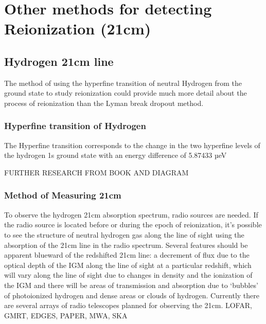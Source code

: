 
\section{Other methods for detecting Reionization (21cm)} %
\label{sec:other_methods21cm}

    \subsection{Hydrogen 21cm line} %
    \label{sub:Hydrogen_21cm}

The method of using the hyperfine transition of neutral Hydrogen from the ground state to study reionization could provide much more detail about the process of reionization than the Lyman break dropout method.

         \subsubsection{Hyperfine transition of Hydrogen} %
         \label{subsub:Hyperfine_Hydrogen}

The Hyperfine transition corresponds to the change in the two hyperfine levels of the hydrogen 1s ground state with an energy difference of 5.87433 µeV

FURTHER RESEARCH FROM BOOK AND DIAGRAM
    
	
         \subsubsection{Method of Measuring 21cm} %
	\label{subsub:Measuring_21cm} 

To observe the hydrogen 21cm absorption spectrum, radio sources are needed. If the radio source is located before or during the epoch of reionization, it’s possible to see the structure of neutral hydrogen gas along the line of sight using the absorption of the 21cm line in the radio spectrum. Several features should be apparent blueward of the redshifted 21cm line: a decrement of flux due to the optical depth of the IGM along the line of sight at a particular redshift, which will vary along the line of sight due to changes in density and the ionization of the IGM and there will be areas of transmission and absorption due to ‘bubbles’ of photoionized hydrogen and dense areas or clouds of hydrogen. Currently there are several arrays of radio telescopes planned for observing the 21cm. LOFAR, GMRT, EDGES, PAPER, MWA, SKA

